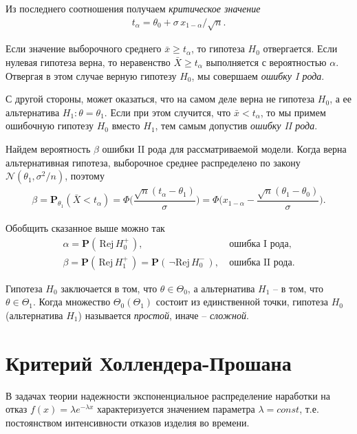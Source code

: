 \documentclass[%
	11pt,
	a4paper,
	utf8,
		]{article}
\begin{document}
Из последнего соотношения получаем \emph{критическое значение}
\begin{align*}
	t_\alpha = \theta_0 + \sigma \, x_{1 - \alpha} / \sqrt{n}.
\end{align*}

Если значение выборочного среднего $ \bar{x} \geqslant t_\alpha$, то гипотеза $ H_0 $ отвергается. Если нулевая гипотеза верна, то неравенство $ \bar{X} \geqslant t_\alpha $ выполняется с вероятностью $ \alpha $. Отвергая в этом случае верную гипотезу $ H_0 $, мы совершаем \emph{ошибку I рода}.

С другой стороны, может оказаться, что на самом деле верна не гипотеза $ H_0 $, а ее альтернатива $ H_1 : \theta = \theta_1$. Если при этом случится, что $ \bar{x} < t_\alpha $, то мы примем ошибочную гипотезу $ H_0 $ вместо $ H_1 $, тем самым допустив \emph{ошибку II рода}.

Найдем вероятность $ \beta $ ошибки II рода для рассматриваемой модели. Когда верна альтернативная гипотеза, выборочное среднее распределено по закону $ \mathcal{N}(\theta_1, \sigma^2/n)$, поэтому
\begin{align*}
	\beta = \mathbf{P}_{\theta_1}(\bar{X} < t_\alpha) = \Phi \Bigg( \dfrac{ \sqrt{n}(t_\alpha - \theta_1) }{\sigma} \Bigg) = \Phi \Bigg( x_{1 - \alpha} - \dfrac{ \sqrt{n}(\theta_1 - \theta_0) }{\sigma} \Bigg).
\end{align*}

Обобщить сказанное выше можно так
\begin{align*}
	\alpha = \mathbf{P}(\,\text{Rej} \, H_0^+\,),\ &\text{ошибка I рода},\\
	\beta = \mathbf{P}(\,\text{Rej} \, H_1^+\,) = \mathbf{P}(\,\neg\text{Rej} \, H_0^-\,),\ &\text{ошибка II рода}.
\end{align*}

Гипотеза $ H_0 $ заключается в том, что $ \theta \in \Theta_0 $, а альтернатива $ H_1 $ -- в том, что $ \theta \in \Theta_1 $. Когда множество $ \Theta_0 (\Theta_1) $ состоит из единственной точки, гипотеза $ H_0 $ (альтернатива $ H_1 $) называется \emph{простой}, иначе -- \emph{сложной}.


\section{Критерий Холлендера-Прошана}

В задачах теории надежности экспоненциальное распределение наработки на отказ $ f(x) = \lambda e^{-\lambda x} $ характеризуется значением параметра $ \lambda = const $, т.е. постоянством интенсивности отказов изделия во времени.
\end{document}
